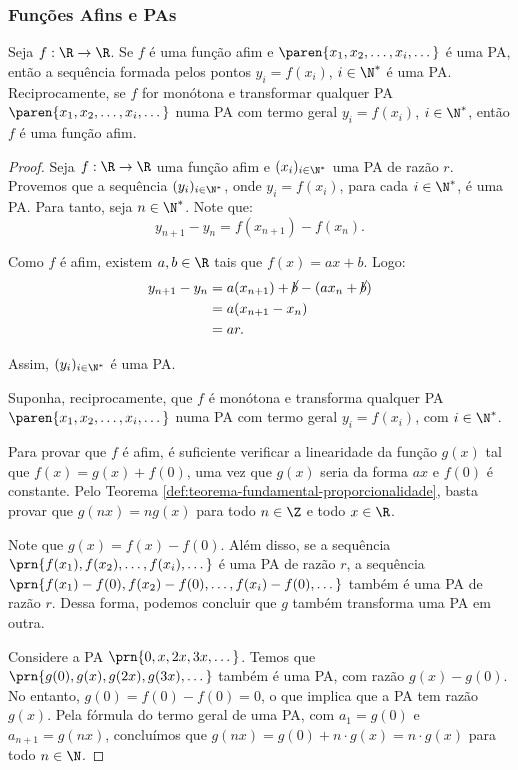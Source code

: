 \subsubsection{Funções Afins e PAs}

\begin{proposition}
Seja  $f: \R \to \R$. Se $f$ é uma função afim e $\paren{x_1, x_2,
\dots , x_i, \dots}$ é uma PA, então a sequência formada pelos
pontos $y_i = f(x_i)$, $i \in \N^*$ é uma PA. Reciprocamente,
se $f$ for monótona e transformar qualquer PA $\paren{x_1, x_2,
\dots , x_i, \dots}$ numa PA com termo geral $y_i = f(x_i)$, $i \in
\N^*$, então $f$ é uma função afim.    
\end{proposition}

\begin{proof}
	Seja $f: \R \to \R$ uma função afim e $(x_i)_{i\in\N^*}$ uma PA de razão $r$. 
	Provemos que a sequência $(y_i)_{i\in\N^*}$, onde $y_i = f(x_i)$, para cada $i \in \N^*$, 
	é uma PA.
	Para tanto, seja $n \in \N^*$. 
	Note que:
	\[
		y_{n+1}-y_n = f(x_{n+1})-f(x_n).
	\]

	Como $f$ é afim, existem $a,b\in\R$ tais que $f(x)=ax+b$.
	Logo:
	\begin{align*}
		y_{n+1}-y_n &= a(x_{n+1})+\cancel b - (ax_n+\cancel b) \\ &= a(x_{n+1}-x_n) \\ &= ar.
	\end{align*}
	
	Assim, $(y_i)_{i\in\N^*}$ é uma PA.

	Suponha, reciprocamente, que $f$ é monótona e transforma qualquer
	PA $\paren{x_1, x_2, \dots , x_i, \dots}$ numa PA com termo geral $y_i = f(x_i)$, com $i \in
	\N^*$. 

	Para provar que $f$ é afim, é suficiente verificar a linearidade da função $g(x)$ tal que
	$f(x) = g(x) + f(0)$, uma vez que $g(x)$ seria da forma $ax$ e $f(0)$ é constante. 
	Pelo Teorema \ref{def:teorema-fundamental-proporcionalidade}, basta provar que 
	$g(nx) = ng(x)$ para todo $n \in \Z$ e todo $x \in \R$.

	Note que $g(x) = f(x) - f(0)$. Além disso, se a sequência $\prn{f(x_1), f(x_2), \dots, f(x_i), \dots}$
	é uma PA de razão $r$, a sequência $\prn{f(x_1) - f(0), f(x_2) - f(0), \dots, f(x_i) - f(0), \dots}$ também é 
	uma PA de razão $r$. Dessa forma, podemos concluir que $g$ também transforma uma PA em outra.

	Considere a PA $\prn{0, x, 2x, 3x, \dots}$. Temos que $\prn{g(0), g(x), g(2x), g(3x), \dots}$
	também é uma PA, com razão $g(x)-g(0)$. No entanto, $g(0) = f(0)-f(0) = 0$, o que implica que a PA tem
	razão $g(x)$. Pela fórmula do termo geral de uma PA, com $a_1 = g(0)$ e $a_{n+1} = g(nx)$,
	concluímos que $g(nx) = g(0) + n\cdot g(x) = n\cdot g(x)$
	para todo $n \in \N$.


\end{proof}
